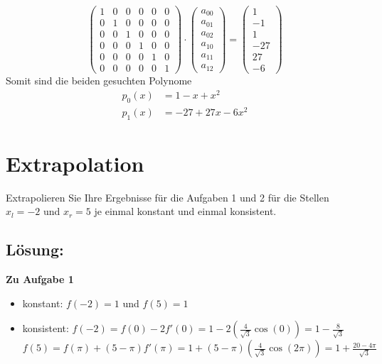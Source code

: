 $$
\begin{pmatrix}1& 0 & 0 & 0 &0&0 \\0&1&0 &0&0&0\\ 0&0&1 &0&0&0 \\ 0&0&0 &1&0&0 \\ 0&0&0&0&1&0 \\ 0&0&0&0&0&1 \end{pmatrix}
\cdot \begin{pmatrix} a_{00}\\a_{01}\\ a_{02}\\ a_{10}\\ a_{11}\\ a_{12}   \end{pmatrix}
=\begin{pmatrix} 1\\-1\\1\\-27 \\27\\-6 \end{pmatrix}
$$
Somit sind die beiden gesuchten Polynome
\begin{align*}
p_0(x)&=1-x+x^2\\
p_1(x)&=-27+27x-6x^2
\end{align*}
\section{Extrapolation}
Extrapolieren Sie Ihre Ergebnisse für die Aufgaben 1 und 2 für die Stellen $x_{l}=-2$ und $x_r=5$ je einmal konstant und einmal konsistent.
\vspace{5mm}

\subsection*{Lösung:}
\textbf{Zu Aufgabe 1}\\
\begin{itemize}
\item konstant: $f(-2)=1$ und $f(5)=1$
\item konsistent: $f(-2)=f(0)-2f'(0)=1-2(\frac{4}{\sqrt{3}}\cos(0))=1-\frac{8}{\sqrt{3}}$\\
\hspace*{16.5mm} $f(5)=f(\pi)+(5-\pi)f'(\pi)=1+(5-\pi)(\frac{4}{\sqrt{3}}\cos(2\pi))=1+\frac{20-4\pi}{\sqrt{3}}$
\end{itemize}

